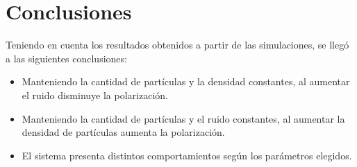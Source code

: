 \documentclass[12pt, a4paper]{report}
\begin{document}
\section{Conclusiones}
Teniendo en cuenta los resultados obtenidos a partir de las simulaciones, se llegó a las siguientes conclusiones:
\begin{itemize}
    \item Manteniendo la cantidad de partículas y la densidad constantes, al aumentar el ruido disminuye la polarización.
    \item Manteniendo la cantidad de partículas y el ruido constantes, al aumentar la densidad de partículas aumenta la polarización.
    \item El sistema presenta distintos comportamientos según los parámetros elegidos.
\end{itemize}



\end{document}
